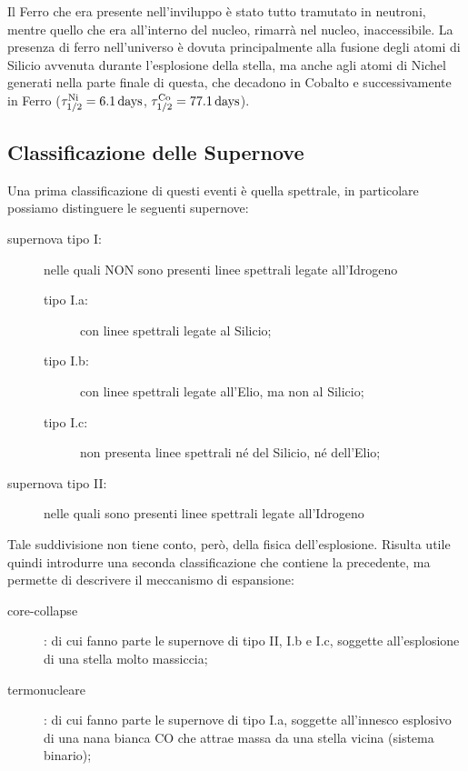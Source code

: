 Il Ferro che era presente nell'inviluppo è stato tutto tramutato in neutroni, mentre quello che era all'interno del nucleo, rimarrà nel nucleo, inaccessibile. La presenza di ferro nell'universo è dovuta principalmente alla fusione degli atomi di Silicio avvenuta durante l'esplosione della stella, ma anche agli atomi di Nichel generati nella parte finale di questa, che decadono in Cobalto e successivamente in Ferro ($\tau_{1/2}^{\mbox{\scriptsize{Ni}}} = \SI{6.1}{days}$, $\tau_{1/2}^{\mbox{\scriptsize{Co}}} = \SI{77.1}{days}$).
\subsection{Classificazione delle Supernove} \label{sec:calss-supernove}

Una prima classificazione di questi eventi è quella spettrale, in particolare possiamo distinguere le seguenti supernove:
\begin{description}
    \item[supernova tipo I:] nelle quali NON sono presenti linee spettrali legate all'Idrogeno
    \begin{description}
        \item[tipo I.a:] con linee spettrali legate al Silicio;
        \item[tipo I.b:] con linee spettrali legate all'Elio, ma non al Silicio;
        \item[tipo I.c:] non presenta linee spettrali né del Silicio, né dell'Elio;
    \end{description}
    \item[supernova tipo II:] nelle quali sono presenti linee spettrali legate all'Idrogeno
\end{description}

Tale suddivisione non tiene conto, però, della fisica dell'esplosione. Risulta utile quindi introdurre una seconda classificazione che contiene la precedente, ma permette di descrivere il meccanismo di espansione:
\begin{description}
    \item[core-collapse]: di cui fanno parte le supernove di tipo II, I.b e I.c, soggette all'esplosione di una stella molto massiccia;
    \item[termonucleare]: di cui fanno parte le supernove di tipo I.a, soggette all'innesco esplosivo di una nana bianca CO che attrae massa da una stella vicina (sistema binario);
\end{description}

